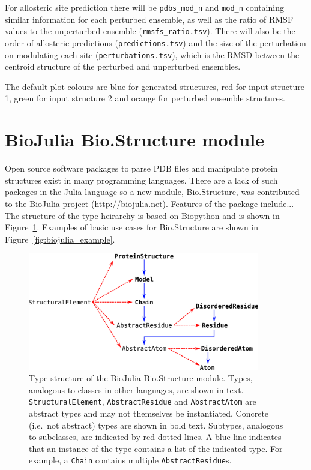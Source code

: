 For allosteric site prediction there will be \verb|pdbs_mod_n| and \verb|mod_n| containing similar information for each perturbed ensemble, as well as the ratio of RMSF values to the unperturbed ensemble (\verb|rmsfs_ratio.tsv|). There will also be the order of allosteric predictions (\verb|predictions.tsv|) and the size of the perturbation on modulating each site (\verb|perturbations.tsv|), which is the RMSD between the centroid structure of the perturbed and unperturbed ensembles.

The default plot colours are blue for generated structures, red for input structure 1, green for input structure 2 and orange for perturbed ensemble structures.


\section{BioJulia Bio.Structure module}

Open source software packages to parse PDB files and manipulate protein structures exist in many programming languages.
There are a lack of such packages in the Julia language so a new module, Bio.Structure, was contributed to the BioJulia project (\url{http://biojulia.net}).
Features of the package include...
The structure of the type heirarchy is based on Biopython \cite{Cock2009} and is shown in Figure~\ref{fig:model_structure}.
Examples of basic use cases for Bio.Structure are shown in Figure~\ref{fig:biojulia_example}.


\begin{figure}
\centering

\includegraphics[width=0.9\textwidth]{figures/model_structure/model_structure}

\caption{Type structure of the BioJulia Bio.Structure module.
Types, analogous to classes in other languages, are shown in text.
\texttt{StructuralElement}, \texttt{AbstractResidue} and \texttt{AbstractAtom} are abstract types and may not themselves be instantiated.
Concrete (i.e.\ not abstract) types are shown in bold text.
Subtypes, analogous to subclasses, are indicated by red dotted lines.
A blue line indicates that an instance of the type contains a list of the indicated type.
For example, a \texttt{Chain} contains multiple \texttt{AbstractResidue}s.}

\label{fig:model_structure}
\end{figure}


